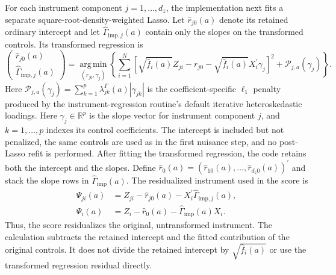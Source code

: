 For each instrument component $j=1,\ldots,d_z$, the implementation next fits a separate square-root-density-weighted Lasso. Let $\widehat r_{j0}(a)$ denote its retained ordinary intercept and let $\widehat\Gamma_{\mathrm{imp},j}(a)$ contain only the slopes on the transformed controls. Its transformed regression is
\begin{equation}
    \begin{pmatrix}
        \widehat r_{j0}(a)\\
        \widehat\Gamma_{\mathrm{imp},j}(a)
    \end{pmatrix}
    =
    \operatorname*{arg\,min}_{(r_{j0},\gamma_j)}
    \left\{
        \sum_{i=1}^{N}
        \left[
            \sqrt{\widehat f_i(a)}Z_{ji}
            -r_{j0}
            -\sqrt{\widehat f_i(a)}X_i^{\prime}\gamma_j
        \right]^2
        +\mathcal{P}_{j,a}(\gamma_j)
    \right\}.
    \label{eq:dml-residualization-implementation}
\end{equation}
Here $\mathcal{P}_{j,a}(\gamma_j)=\sum_{k=1}^{p}\lambda^{\Gamma}_{jk}(a)|\gamma_{jk}|$ is the coefficient-specific $\ell_1$ penalty produced by the instrument-regression routine's default iterative heteroskedastic loadings. Here $\gamma_j\in\mathbb{R}^{p}$ is the slope vector for instrument component $j$, and $k=1,\ldots,p$ indexes its control coefficients. The intercept is included but not penalized, the same controls are used as in the first nuisance step, and no post-Lasso refit is performed. After fitting the transformed regression, the code retains both the intercept and the slopes. Define $\widehat r_0(a)=(\widehat r_{10}(a),\ldots,\widehat r_{d_z0}(a))^{\prime}$ and stack the slope rows in $\widehat\Gamma_{\mathrm{imp}}(a)$. The residualized instrument used in the score is
\begin{equation}
    \begin{aligned}
        \widehat\Psi_{ji}(a)
        &=
        Z_{ji}-\widehat r_{j0}(a)-X_i^{\prime}\widehat\Gamma_{\mathrm{imp},j}(a),\\
        \widehat\Psi_i(a)
        &=
        Z_i-\widehat r_0(a)-\widehat\Gamma_{\mathrm{imp}}(a)X_i.
    \end{aligned}
    \label{eq:estimated-residualized-instrument}
\end{equation}
Thus, the score residualizes the original, untransformed instrument. The calculation subtracts the retained intercept and the fitted contribution of the original controls. It does not divide the retained intercept by $\sqrt{\widehat f_i(a)}$ or use the transformed regression residual directly.

